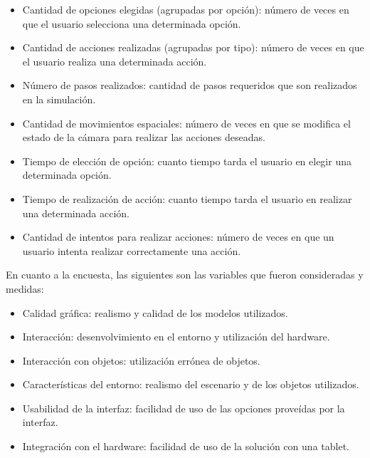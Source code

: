 \begin{itemize}

\item Cantidad de opciones elegidas (agrupadas por opción): número de veces en
    que el usuario selecciona una determinada opción.

\item Cantidad de acciones realizadas (agrupadas por tipo): número de veces  en
    que el usuario realiza una determinada acción.

\item Número de pasos realizados: cantidad de pasos requeridos que son
    realizados en la simulación. 

\item Cantidad de movimientos espaciales: número de veces en que se modifica el
    estado de la cámara para realizar las acciones deseadas.

\item Tiempo de elección de opción: cuanto tiempo tarda el usuario en elegir una
    determinada opción.

\item Tiempo de realización de acción: cuanto tiempo tarda el usuario en
    realizar una determinada acción.

\item Cantidad de intentos para realizar acciones: número de veces en que un
    usuario intenta realizar correctamente una acción. 

\end{itemize}

En cuanto a la encuesta, las siguientes son las variables que fueron consideradas y medidas:

\begin{itemize}

\item Calidad gráfica: realismo y calidad de los modelos utilizados.

\item Interacción: desenvolvimiento en el entorno y utilización del hardware.

\item Interacción con objetos: utilización errónea de objetos.

\item Características del entorno: realismo del escenario y de los objetos
    utilizados.

\item Usabilidad de la interfaz: facilidad de uso de las opciones proveídas por
    la interfaz.

\item Integración con el hardware: facilidad de uso de la solución con una
    tablet. 

\end{itemize}

